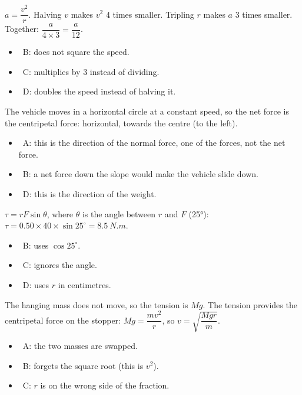 \documentclass[12pt]{article}
\begin{document}
\begin{practiceanswers}
\begin{practiceans}
  $a = \dfrac{v^2}{r}$. Halving $v$ makes $v^2$ 4 times smaller. Tripling $r$ makes $a$ 3 times
  smaller. Together: $\dfrac{a}{4 \times 3} = \dfrac{a}{12}$.
  \begin{itemize}
    \item \xmark\ B: does not square the speed.
    \item \xmark\ C: multiplies by 3 instead of dividing.
    \item \xmark\ D: doubles the speed instead of halving it.
  \end{itemize}
\end{practiceans}

\begin{practiceans}
  The vehicle moves in a horizontal circle at a constant speed, so the net force is the centripetal
  force: horizontal, towards the centre (to the left).
  \begin{itemize}
    \item \xmark\ A: this is the direction of the normal force, one of the forces, not the net force.
    \item \xmark\ B: a net force down the slope would make the vehicle slide down.
    \item \xmark\ D: this is the direction of the weight.
  \end{itemize}
\end{practiceans}

\begin{practiceans}
  $\tau = rF\sin\theta$, where $\theta$ is the angle between $r$ and $F$ (\ang{25}):
  $\tau = 0.50 \times 40 \times \sin 25^\circ = \qty{8.5}{N.m}$.
  \begin{itemize}
    \item \xmark\ B: uses $\cos 25^\circ$.
    \item \xmark\ C: ignores the angle.
    \item \xmark\ D: uses $r$ in centimetres.
  \end{itemize}
\end{practiceans}

\begin{practiceans}
  The hanging mass does not move, so the tension is $Mg$. The tension provides the centripetal
  force on the stopper: $Mg = \dfrac{mv^2}{r}$, so $v = \sqrt{\dfrac{Mgr}{m}}$.
  \begin{itemize}
    \item \xmark\ A: the two masses are swapped.
    \item \xmark\ B: forgets the square root (this is $v^2$).
    \item \xmark\ C: $r$ is on the wrong side of the fraction.
  \end{itemize}
\end{practiceans}


\end{practiceanswers}
\end{document}
